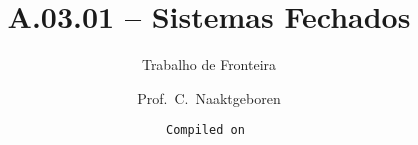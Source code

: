 \makeatletter
\immediate{} %
\makeatother
\usepackage{beamerthemeCopenhagen}
\usepackage[utf8]{inputenc}
\usepackage[english,brazil]{babel} %
\usepackage{pslatex}
\usepackage{amssymb,amsmath}
\usepackage{soul}
\usepackage[squaren,Gray]{SIunits}
\usepackage{xspace}
\newcommand{\enfa}[1]{{\color{enfa}{#1}}}
\newcommand{\gray}[1]{{\color{gray}{#1}}}
\newcommand{\txtpic}[1]{%
    \fcolorbox{lightgray}{white!90!black}{{#1}} 
}
\newcommand{\vet}[1]{\underline{{#1}}}
\newcommand{\mat}[1]{\underline{\underline{{#1}}}}
\newcommand{\cub}[1]{\underline{\underline{\underline{{#1}}}}}
\newcommand{\eqdef}{{\ensuremath\stackrel{\text{\tiny def}}{=}}}
\title{A.03.01 -- Sistemas Fechados}
\subtitle{Trabalho de Fronteira}
\author{Prof.~C.~Naaktgeboren}
\date{\tt Compiled on }

    \frame{\titlepage}
